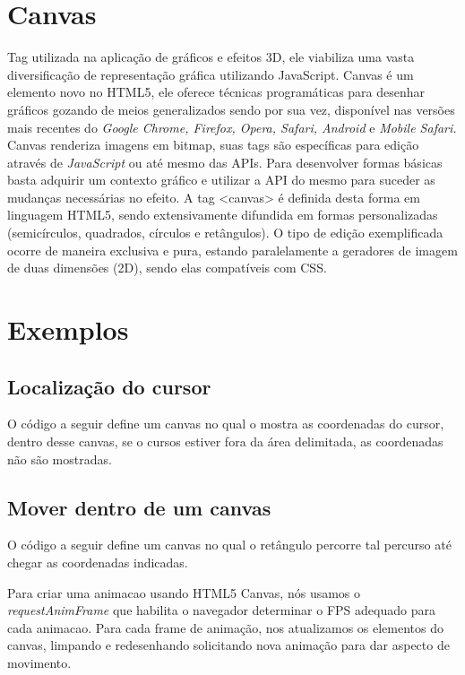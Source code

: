 \documentclass[12pt,a4paper]{article}
\begin{document}
	
\section{Canvas}	

Tag utilizada na aplicação de gráficos e efeitos 3D, ele viabiliza uma vasta diversificação de representação gráfica utilizando JavaScript. Canvas é um elemento novo no HTML5, ele oferece técnicas programáticas para desenhar gráficos gozando de meios generalizados sendo por sua vez, disponível nas versões mais recentes do \textit{Google Chrome, Firefox, Opera, Safari, Android }e\textit{ Mobile Safari. }
	Canvas renderiza imagens em bitmap, suas tags são específicas para edição através de \textit{JavaScript} ou até mesmo das APIs. Para desenvolver formas básicas basta adquirir um contexto gráfico e utilizar a API do mesmo para suceder as mudanças necessárias no efeito. A tag <canvas> é definida desta forma em linguagem HTML5, sendo extensivamente difundida em formas personalizadas (semicírculos, quadrados, círculos e retângulos). O tipo de edição exemplificada ocorre de maneira exclusiva e pura, estando paralelamente a geradores de imagem de duas dimensões (2D), sendo elas compatíveis com CSS. 


\section{Exemplos}

\subsection{Localização do cursor}
O código a seguir define um canvas no qual o mostra as coordenadas do cursor, dentro desse canvas, se o cursos estiver fora da área delimitada, as coordenadas não são mostradas.


\subsection{Mover dentro de um canvas}

O código a seguir define um canvas no qual o retângulo percorre tal percurso até chegar as coordenadas indicadas.  





Para criar uma animacao usando HTML5 Canvas, nós usamos o \textit{requestAnimFrame} que habilita o navegador determinar o FPS adequado para cada animacao.  Para cada frame de animação, nos atualizamos os elementos do canvas, limpando e redesenhando solicitando nova animação para dar aspecto de movimento. 
\end{document}
